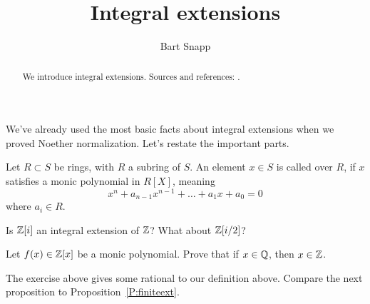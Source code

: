 \documentclass{ximera}
\author{Bart Snapp}
\title{Integral extensions}
\begin{document}
\begin{abstract}
  We introduce integral extensions. Sources and references:
  \cite{AM1974}.
\end{abstract}
\maketitle


We've already used the most basic facts about integral extensions when
we proved Noether normalization. Let's restate the important parts.
\begin{definition}
  Let $R\subset S$ be rings, with $R$ a subring of $S$. An element
  $x\in S$ is called  over $R$, if $x$ satisfies a monic
  polynomial in $R[X]$, meaning
  \[
  x^n + a_{n-1} x^{n-1} + \dots + a_1 x + a_0  = 0
  \]
  where $a_i\in R$.
\end{definition}


\begin{exercise}
  Is $\mathbb Z[i]$ an integral extension of $\mathbb Z$? What about $\mathbb Z[i/2]$?
\end{exercise}


\begin{exercise}
  Let $f(x)\in\mathbb Z[x]$ be a monic polynomial. Prove that if $x\in\mathbb Q$,
  then $x\in\mathbb Z$.
\end{exercise}




The exercise above gives some rational to our definition
above. Compare the next proposition to Proposition~\ref{P:finiteext}.
\end{document}

